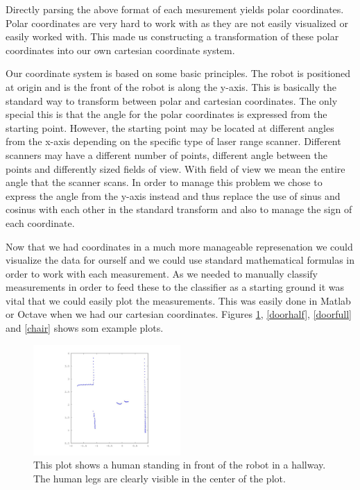 \documentclass[a4paper, 10pt, conference]{ieeeconf}      %
\begin{document}
Directly parsing the above format of each mesurement yields polar coordinates. Polar coordinates are very hard to work with as they are not easily visualized or easily worked with. This made us constructing a transformation of these polar coordinates into our own cartesian coordinate system.

Our coordinate system is based on some basic principles. The robot is positioned at origin and is the front of the robot is along the y-axis. This is basically the standard way to transform between polar and cartesian coordinates. The only special this is that the angle for the polar coordinates is expressed from the starting point. However, the starting point may be located at different angles from the x-axis depending on the specific type of laser range scanner. Different scanners may have a different number of points, different angle between the points and differently sized fields of view. With field of view we mean the entire angle that the scanner scans. In order to manage this problem we chose to express the angle from the y-axis instead and thus replace the use of sinus and cosinus with each other in the standard transform and also to manage the sign of each coordinate.

Now that we had coordinates in a much more manageable represenation we could visualize the data for ourself and we could use standard mathematical formulas in order to work with each measurement. As we needed to manually classify measurements in order to feed these to the classifier as a starting ground it was vital that we could easily plot the measurements. This was easily done in Matlab or Octave when we had our cartesian coordinates. Figures \ref{human}, \ref{doorhalf}, \ref{doorfull} and \ref{chair} shows som example plots.


\begin{figure}
\centering
\includegraphics[width=0.5\textwidth]{presimg/human.jpg}
\caption{This plot shows a human standing in front of the robot in a hallway. The human legs are clearly visible in the center of the plot.}
\label{human}
\end{figure}
\end{document}
